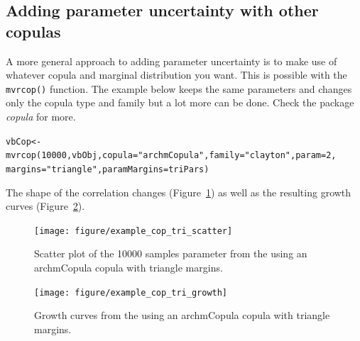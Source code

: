 \documentclass[a4paper,english,10pt]{article}\usepackage[]{graphicx}\usepackage[]{color}
\makeatletter
\newcommand{\hlnum}[1]{\textcolor[rgb]{0.2,0.2,0.2}{#1}}%
\newcommand{\hlstr}[1]{\textcolor[rgb]{0.2,0.2,0.2}{#1}}%
\newcommand{\hlstd}[1]{\textcolor[rgb]{0,0,0}{#1}}%
\newcommand{\hlkwb}[1]{\textcolor[rgb]{0.361,0.506,0.596}{#1}}%
\newcommand{\hlkwc}[1]{\textcolor[rgb]{0.361,0.506,0.596}{#1}}%
\newcommand{\hlkwd}[1]{\textcolor[rgb]{0.361,0.506,0.596}{#1}}%
\newenvironment{kframe}{%
 \def\at@end@of@kframe{}%
 \ifinner\ifhmode%
  \def\at@end@of@kframe{\end{minipage}}%
  \begin{minipage}{\columnwidth}%
 \fi\fi%
 \def\FrameCommand##1{\hskip\@totalleftmargin \hskip-\fboxsep
 \colorbox{shadecolor}{##1}\hskip-\fboxsep
     \hskip-\linewidth \hskip-\@totalleftmargin \hskip\columnwidth}%
 \MakeFramed {\advance\hsize-\width
   \@totalleftmargin\z@ \linewidth\hsize
   \@setminipage}}%
 {\par\unskip\endMakeFramed%
 \at@end@of@kframe}
\newenvironment{knitrout}{}{} %
\newcommand{\code}[1]{{\texttt{#1}}}
\makeatother
\begin{document}
\subsection{Adding parameter uncertainty with other copulas}

A more general approach to adding parameter uncertainty is to make use of whatever copula and marginal distribution you want.
This is possible with the \code{mvrcop()} function. The example below keeps the same parameters and changes only the copula type and family but a lot more can be done. Check the package \emph{copula} for more. 


\begin{knitrout}
\color{fgcolor}\begin{kframe}
\begin{alltt}
\hlstd{vbCop} \hlkwb{<-} \hlkwd{mvrcop}\hlstd{(}\hlnum{10000}\hlstd{, vbObj,} \hlkwc{copula} \hlstd{=} \hlstr{"archmCopula"}\hlstd{,} \hlkwc{family} \hlstd{=} \hlstr{"clayton"}\hlstd{,} \hlkwc{param} \hlstd{=} \hlnum{2}\hlstd{,}
    \hlkwc{margins} \hlstd{=} \hlstr{"triangle"}\hlstd{,} \hlkwc{paramMargins} \hlstd{= triPars)}
\end{alltt}
\end{kframe}
\end{knitrout}


The shape of the correlation changes (Figure~\ref{fig:plot_cop_tri_scatter}) as well as the resulting growth curves (Figure~\ref{fig:plot_cop_tri_growth}). 







\begin{figure}[h]
\begin{knitrout}
\color{fgcolor}

{\centering \texttt{[image: figure/example\_cop\_tri\_scatter]} 

}



\end{knitrout}

\caption{Scatter plot of the 10000 samples parameter from the using an archmCopula copula with triangle margins.}
\label{fig:plot_cop_tri_scatter}
\end{figure}

\begin{figure}[h]
\begin{knitrout}
\color{fgcolor}

{\centering \texttt{[image: figure/example\_cop\_tri\_growth]} 

}



\end{knitrout}

\caption{Growth curves from the using an archmCopula copula with triangle margins.}
\label{fig:plot_cop_tri_growth}
\end{figure}
\end{document}
